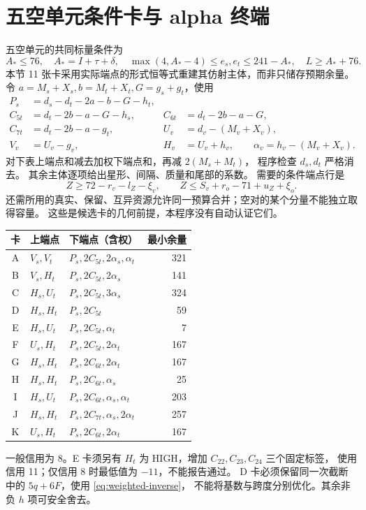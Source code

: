 \documentclass[11pt,a4paper]{article}
\newcommand{\A}{A_*}
\begin{document}
\section{五空单元条件卡与 alpha 终端}
五空单元的共同标量条件为
\[
\A\le76,\quad \A=I+\tau+\delta,\quad
\max(4,\A-4)\le e_s,e_t\le241-\A,\quad L\ge\A+76.
\]
本节 11 张卡采用实际端点的形式恒等式重建其仿射主体，而非只储存预期余量。
令 $a=M_s+X_s,b=M_t+X_t,G=g_s+g_t$，使用
\begin{align*}
P_s&=d_s-d_t-2a-b-G-h_t,\\
C_{5t}&=d_t-2b-a-G-h_s,&C_{6t}&=d_t-2b-a-G,\\
C_{7t}&=d_t-2b-a-g_t,&U_v&=d_v-(M_v+X_v),\\
V_v&=U_v-g_v,&H_v&=U_v+h_v,\qquad \alpha_v=h_v-(M_v+X_v).
\end{align*}
对下表上端点和减去加权下端点和，再减 $2(M_s+M_t)$，
程序检查 $d_s,d_t$ 严格消去。
其余主体逐项给出星形、间隔、质量和尾部的系数。
需要的条件端点行是
\[
 Z\ge72-r_v-l_Z-\xi_v,\qquad
 Z\le S_v+r_o-71+u_Z+\xi_o.
\]
还需所用的真实、保留、互异资源允许同一预算合并；空对的某个分量不能独立取得容量。
这些是候选卡的几何前提，本程序没有自动认证它们。
\begin{center}\small\begin{tabular}{cllr}\toprule
卡&上端点&下端点（含权）&最小余量\\\midrule
A&$V_s,V_t$&$P_s,2C_{5t},2\alpha_s,\alpha_t$&321\\
B&$V_s,H_t$&$P_s,2C_{5t},2\alpha_s$&141\\
C&$H_s,U_t$&$P_s,2C_{5t},3\alpha_s$&324\\
D&$H_s,H_t$&$P_s,2C_{5t}$&59\\
E&$H_s,U_t$&$P_s,2C_{5t},\alpha_t$&7\\
F&$U_s,H_t$&$P_s,2C_{5t},2\alpha_t$&167\\
G&$H_s,H_t$&$P_s,2C_{6t},2\alpha_t$&167\\
H&$H_s,H_t$&$P_s,2C_{6t},\alpha_s$&25\\
I&$H_s,U_t$&$P_s,2C_{6t},\alpha_s,\alpha_t$&203\\
J&$H_s,H_t$&$P_s,2C_{7t},\alpha_s,2\alpha_t$&257\\
K&$U_s,H_t$&$P_s,2C_{6t},2\alpha_t$&167\\\bottomrule
\end{tabular}\end{center}
一般信用为 8。E 卡须另有 $H_t$ 为 HIGH，增加 $C_{22},C_{23},C_{24}$ 三个固定标签，
使用信用 11；仅信用 8 时最低值为 $-11$，不能报告通过。
D 卡必须保留同一次截断中的 $5q+6F$，使用 \eqref{eq:weighted-inverse}，
不能将基数与跨度分别优化。其余非负 $h$ 项可安全舍去。
\end{document}
